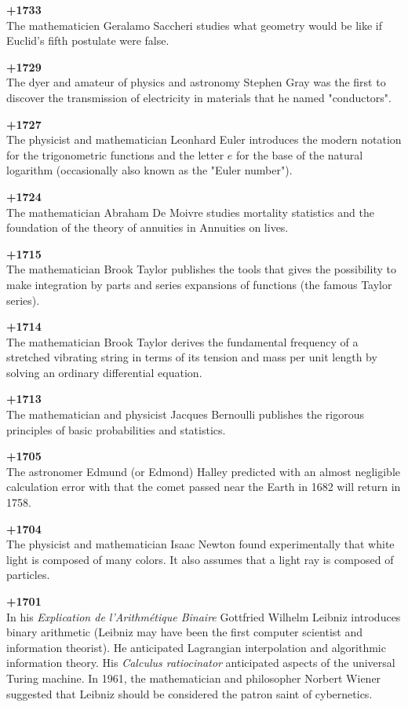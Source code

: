 \textbf{+1733}\\
The mathematicien Geralamo Saccheri studies what geometry would be like if Euclid's fifth postulate were false.

\textbf{+1729}\\
The dyer and amateur of physics and astronomy Stephen Gray was the first to discover the transmission of electricity in materials that he named "conductors".

\textbf{+1727}\\
The physicist and mathematician Leonhard Euler introduces the modern notation for the trigonometric functions and the letter $e$ for the base of the natural logarithm (occasionally also known as the "Euler number").

\textbf{+1724}\\
The mathematician Abraham De Moivre studies mortality statistics and the foundation of the theory of annuities in Annuities on lives.

\textbf{+1715}\\
The mathematician Brook Taylor publishes the tools that gives the possibility to make integration by parts and series expansions of functions (the famous Taylor series).

\textbf{+1714}\\
The mathematician Brook Taylor derives the fundamental frequency of a stretched vibrating string in terms of its tension and mass per unit length by solving an ordinary differential equation.

\textbf{+1713}\\
The mathematician and physicist Jacques Bernoulli publishes the rigorous principles of basic probabilities and statistics.

\textbf{+1705}\\
The astronomer Edmund (or Edmond) Halley predicted with an almost negligible calculation error with that the comet passed near the Earth in 1682 will return in 1758.

\textbf{+1704}\\
The physicist and mathematician Isaac Newton found experimentally that white light is composed of many colors. It also assumes that a light ray is composed of particles.

\textbf{+1701}\\
In his \textit{Explication de l'Arithmétique Binaire} Gottfried Wilhelm Leibniz introduces binary arithmetic (Leibniz may have been the first computer scientist and information theorist). He anticipated Lagrangian interpolation and algorithmic information theory. His \textit{Calculus ratiocinator} anticipated aspects of the universal Turing machine. In 1961, the mathematician and philosopher Norbert Wiener suggested that Leibniz should be considered the patron saint of cybernetics.

